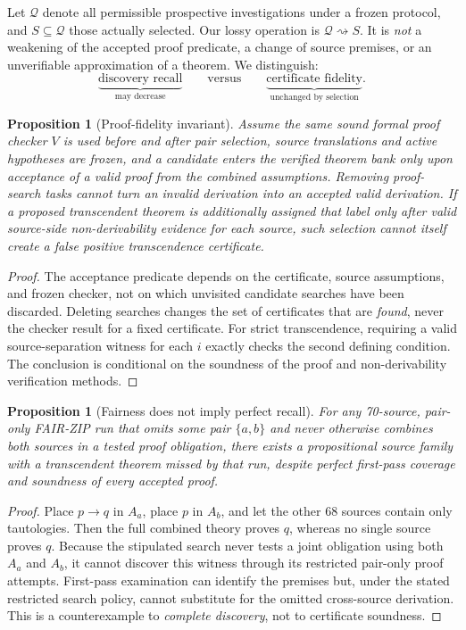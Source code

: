 \documentclass[11pt,letterpaper]{article}
\newtheorem{proposition}[theorem]{Proposition}
\begin{document}
Let $\mathcal Q$ denote all permissible prospective investigations under a frozen protocol, and $S\subseteq\mathcal Q$ those actually selected. Our lossy operation is $\mathcal Q\rightsquigarrow S$. It is \emph{not} a weakening of the accepted proof predicate, a change of source premises, or an unverifiable approximation of a theorem. We distinguish:
\[
\underbrace{\text{discovery recall}}_{\text{may decrease}}
\qquad\text{versus}\qquad
\underbrace{\text{certificate fidelity}}_{\text{unchanged by selection}}.
\]

\begin{proposition}[Proof-fidelity invariant]
Assume the same sound formal proof checker $V$ is used before and after pair selection, source translations and active hypotheses are frozen, and a candidate enters the verified theorem bank only upon acceptance of a valid proof from the combined assumptions. Removing proof-search tasks cannot turn an invalid derivation into an accepted valid derivation. If a proposed transcendent theorem is additionally assigned that label only after valid source-side non-derivability evidence for \emph{each} source, such selection cannot itself create a false positive transcendence certificate.
\end{proposition}
\begin{proof}
The acceptance predicate depends on the certificate, source assumptions, and frozen checker, not on which unvisited candidate searches have been discarded. Deleting searches changes the set of certificates that are \emph{found}, never the checker result for a fixed certificate. For strict transcendence, requiring a valid source-separation witness for each $i$ exactly checks the second defining condition. The conclusion is conditional on the soundness of the proof and non-derivability verification methods.
\end{proof}

\begin{proposition}[Fairness does not imply perfect recall]
For any 70-source, pair-only FAIR-ZIP run that omits some pair $\{a,b\}$ and never otherwise combines both sources in a tested proof obligation, there exists a propositional source family with a transcendent theorem missed by that run, despite perfect first-pass coverage and soundness of every accepted proof.
\end{proposition}
\begin{proof}
Place $p\to q$ in $A_a$, place $p$ in $A_b$, and let the other 68 sources contain only tautologies. Then the full combined theory proves $q$, whereas no single source proves $q$. Because the stipulated search never tests a joint obligation using both $A_a$ and $A_b$, it cannot discover this witness through its restricted pair-only proof attempts. First-pass examination can identify the premises but, under the stated restricted search policy, cannot substitute for the omitted cross-source derivation. This is a counterexample to \emph{complete discovery}, not to certificate soundness.
\end{proof}
\end{document}
